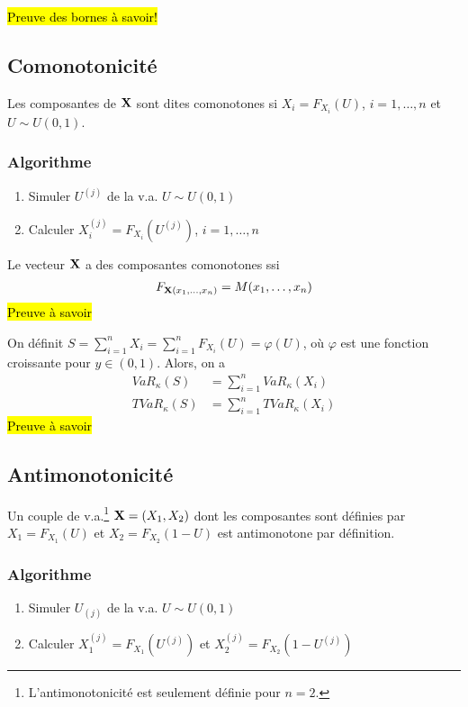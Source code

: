 \documentclass[10pt, french]{article}
\begin{document}
\begin{multicols*}{2}
\hl{Preuve des bornes à savoir!}


\subsection{Comonotonicité}
Les composantes de $\mathbf{X}$ sont dites comonotones si $X_i = F_{X_i}(U)$, $i = 1, \dots, n$ et $U \sim U(0,1)$.

\subsubsection{Algorithme}
\begin{enumerate}
\item Simuler $U^{(j)}$ de la v.a. $U \sim U(0,1)$
\item Calculer $X_i^{(j)} = F_{X_i}(U^{(j)})$, $i = 1, \dots, n$
\end{enumerate}

\begin{definition}
Le vecteur $\mathbf{X}$ a des composantes comonotones ssi
\begin{align*}
F_{\mathbf{X}(x_1, \dots, x_n)} = M(x_1, \dots, x_n)
\end{align*}
\hl{Preuve à savoir}
\end{definition}

\begin{definition}
On définit $S = \sum_{i=1}^{n} X_i = \sum_{i=1}^{n} F_{X_i}(U) = \varphi(U)$, où $\varphi$ est une fonction croissante pour $y \in (0,1)$. Alors, on a
\begin{align*}
VaR_{\kappa}(S) & = \sum_{i=1}^{n} VaR_{\kappa}(X_i) \\
TVaR_{\kappa}(S) & = \sum_{i=1}^{n} TVaR_{\kappa}(X_i)
\end{align*}
\hl{Preuve à savoir}
\end{definition}


\subsection{Antimonotonicité}
Un couple de v.a.\footnote{L'antimonotonicité est seulement définie pour $n=2$.} $\mathbf{X} = (X_1, X_2)$ dont les composantes sont définies par $X_1 = F_{X_1}(U)$ et $X_2 = F_{X_2}(1-U)$ est antimonotone par définition.

\subsubsection{Algorithme}
\begin{enumerate}
\item Simuler $U_{(j)}$ de la v.a. $U \sim U(0,1)$
\item Calculer $X_1^{(j)} = F_{X_1}(U^{(j)})$ et $X_2^{(j)} = F_{X_2}(1 - U^{(j)})$
\end{enumerate}


\end{multicols*}
\end{document}
